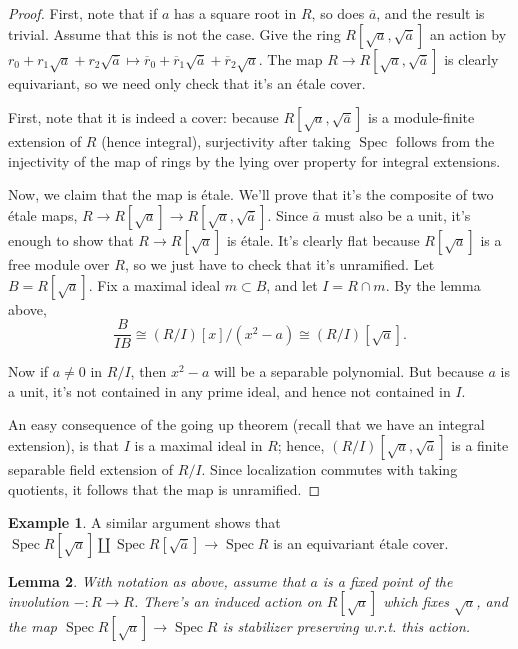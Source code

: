 \documentclass[draftthesis,tocnosub,noragright,centerchapter,10pt]{uiucthesis2009}
\DeclareMathOperator{\Spec}{Spec}
\theoremstyle{plain}
\newtheorem{lemma}{Lemma}
\theoremstyle{definition}
\newtheorem{example}[lemma]{Example}
\begin{document}
\begin{proof}
First, note that if $a$ has a square root in $R$, so does $\overline
a$, and the result is trivial. Assume that this is not the case. Give
the ring $R[\sqrt{a},\sqrt{\overline a}]$ an action by $r_0 +
r_1\sqrt{a} + r_2\sqrt{\overline a} \mapsto \overline r_0 + \overline
r_1\sqrt{\overline a} + \overline r_2 \sqrt{a}$. The map $R
\rightarrow R[\sqrt{a},\sqrt{\overline a}]$ is clearly equivariant, so
we need only check that it's an \'etale cover.

First, note that it is indeed a cover: because
$R[\sqrt{a},\sqrt{\overline a}]$ is a module-finite extension of $R$
(hence integral),
surjectivity after taking $\Spec$ follows from the injectivity of the
map of rings by the lying over property for integral extensions. 

Now, we claim that the map is \'etale. We'll prove that it's the
composite of two \'etale maps, $R \rightarrow R[\sqrt{a}] \rightarrow
R[\sqrt{a},\sqrt{\overline a}]$. Since $\overline a$ must also be a
unit, it's enough to show that $R \rightarrow R[\sqrt{a}]$ is \'etale. It's clearly flat because
$R[\sqrt{a}]$ is a free module over $R$, so we just
have to check that it's unramified. Let $B =
R[\sqrt{a}]$. Fix a maximal ideal $m \subset
B$, and let $I = R \cap m$. By the lemma above,
\[
\frac{B}{IB} \cong (R/I)[x]/(x^2 - a) \cong (R/I)[\sqrt{a}].
\]

Now if $a \neq 0$ in $R/I$, then $x^2-a$ will be a separable polynomial. But because $a$ is a unit, it's not contained in any prime
ideal, and hence not contained in $I$.

An easy consequence of the going up theorem (recall that we have
an integral extension), is that $I$ is a maximal ideal in $R$; hence,
$(R/I)[\sqrt{a},\sqrt{\overline a}]$ is a finite separable field
extension of $R/I$. Since localization commutes with taking quotients,
it follows that the map is unramified. 
\end{proof}

\begin{example}
A similar argument shows that $\Spec R[\sqrt{a}] \coprod \Spec
R[\sqrt{\overline a}] \rightarrow \Spec R$ is an equivariant \'etale cover.
\end{example}

\begin{lemma}
With notation as above, assume that $a$ is a fixed point of the
involution $- : R \rightarrow R$. There's an induced action on $ R[\sqrt{a}]$
which fixes $\sqrt{a}$, and the map $\Spec R[\sqrt{a}] \rightarrow
\Spec R$ is stabilizer preserving w.r.t. this action.
\end{lemma}
\end{document}
